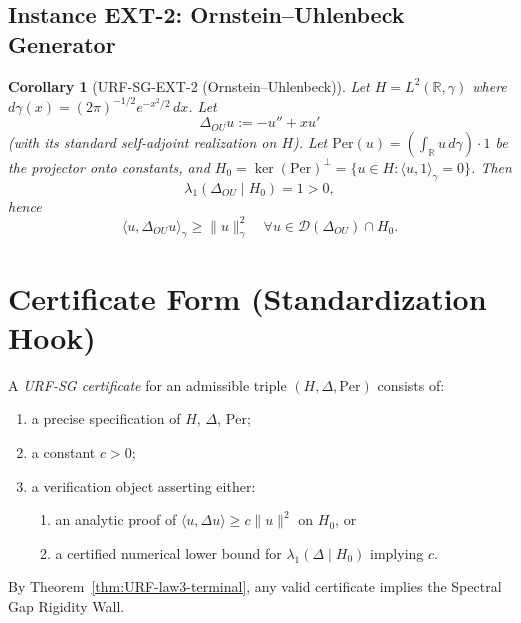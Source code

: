 \documentclass[11pt]{article}
\newtheorem{corollary}{Corollary}
\begin{document}
\subsection*{Instance EXT-2: Ornstein--Uhlenbeck Generator}

\begin{corollary}[URF-SG-EXT-2 (Ornstein--Uhlenbeck)]
Let $H=L^2(\mathbb R,\gamma)$ where $d\gamma(x)=(2\pi)^{-1/2}e^{-x^2/2}\,dx$.
Let
\[
\Delta_{OU}u := -u'' + x u'
\]
(with its standard self-adjoint realization on $H$).
Let $\mathrm{Per}(u) = \left(\int_{\mathbb R} u\,d\gamma\right)\cdot 1$ be the projector onto constants,
and $H_0=\ker(\mathrm{Per})^\perp=\{u\in H:\langle u,1\rangle_\gamma=0\}$.
Then
\[
\lambda_1(\Delta_{OU}\mid H_0)=1>0,
\]
hence
\[
\langle u,\Delta_{OU}u\rangle_\gamma \ge \|u\|_\gamma^2
\quad \forall u\in \mathcal D(\Delta_{OU})\cap H_0.
\]
\end{corollary}

\section{Certificate Form (Standardization Hook)}
A \emph{URF-SG certificate} for an admissible triple $(H,\Delta,\mathrm{Per})$ consists of:
\begin{enumerate}[label=(\roman*)]
\item a precise specification of $H$, $\Delta$, $\mathrm{Per}$;
\item a constant $c>0$;
\item a verification object asserting either:
\begin{enumerate}[label=(\alph*)]
\item an analytic proof of $\langle u,\Delta u\rangle\ge c\|u\|^2$ on $H_0$, or
\item a certified numerical lower bound for $\lambda_1(\Delta\mid H_0)$ implying $c$.
\end{enumerate}
\end{enumerate}
By Theorem~\ref{thm:URF-law3-terminal}, any valid certificate implies the Spectral Gap Rigidity Wall.
\end{document}
